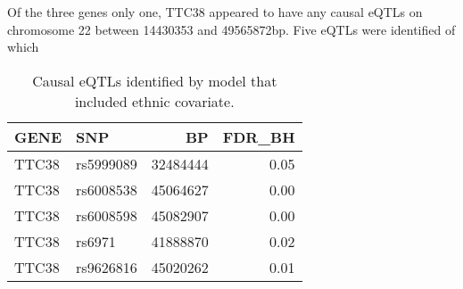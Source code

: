 \documentclass[12pt,a4paper]{article}
\begin{document}
Of the three genes only one, TTC38 appeared to have any causal eQTLs on chromosome 22 between 14430353 and 49565872bp. Five eQTLs were identified of which 

\begin{table}[h]
\centering
\begin{tabular}{llrr}
  \hline
GENE & SNP & BP & FDR\_BH \\ 
  \hline
TTC38 & rs5999089 & 32484444 & 0.05 \\ 
  TTC38 & rs6008538 & 45064627 & 0.00 \\ 
  TTC38 & rs6008598 & 45082907 & 0.00 \\ 
  TTC38 & rs6971 & 41888870 & 0.02 \\ 
  TTC38 & rs9626816 & 45020262 & 0.01 \\ 
   \hline
\end{tabular}
\caption[eQTL]{Causal eQTLs identified by model that included ethnic covariate.}
\end{table}


\FloatBarrier


\end{document}
